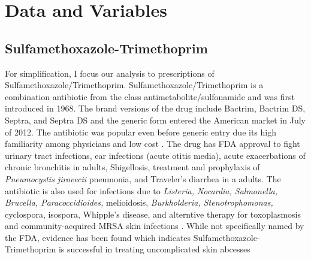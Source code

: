 \chapter{Data and Variables}

\section{Sulfamethoxazole-Trimethoprim}
\indent For simplification, I focus our analysis to prescriptions of Sulfamethoxazole/Trimethoprim. Sulfamethoxazole/Trimethoprim is a combination antibiotic from the class antimetabolite/sulfonamide and was first introduced in 1968. The brand versions of the drug include Bactrim, Bactrim DS, Septra, and Septra DS and the generic form entered the American market in July of 2012. The antibiotic was popular even before generic entry due its high familiarity among physicians and low cost \cite{noauthor_sulfamethoxazole_nodate,ho_considerations_2011}. The drug has FDA approval to fight urinary tract infections, ear infections (acute otitis media), acute exacerbations of chronic bronchitis in adults, Shigellosis, treatment and prophylaxis of \textit{Pneumocystis jirovecii} pneumonia, and Traveler's diarrhea in a adults. The antibiotic is also used for infections due to \textit{Listeria, Nocardia, Salmonella, Brucella, Paracoccidioides,} melioidosis, \textit{Burkholderia, Stenotrophomonas,} cyclospora, isospora, Whipple's disease, and alterntive therapy for toxoplasmosis and community-acquired MRSA skin infections \cite{schlossberg_antibiotics_2017}. While not specifically named by the FDA, evidence has been found which indicates Sulfamethoxazole-Trimethoprim is successful in treating uncomplicated skin abcesses \cite{noauthor_trimethoprimsulfamethoxazole_nodate}\\


